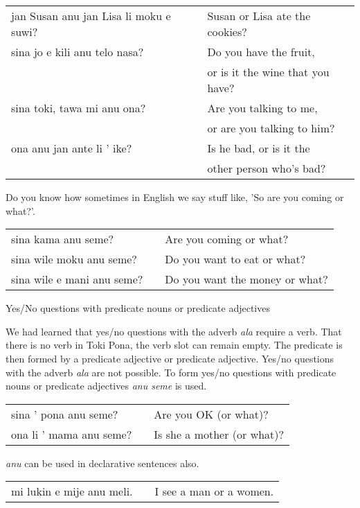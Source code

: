 \begin{supertabular}{p{5,5cm}|ll}
jan Susan anu jan Lisa li moku e suwi?  && Susan or Lisa ate the cookies? \\
sina jo e kili anu telo nasa? && Do you have the fruit, \\ && or is it the wine that you have? \\
sina toki, tawa mi anu ona? && Are you talking to me, \\ && or are you talking to him? \\
ona anu jan ante li ' ike? && Is he bad, or is it the \\ && other person who's bad? \\
\end{supertabular} 

Do you know how sometimes in English we say stuff like, 'So are you coming or what?'. 

\begin{supertabular}{p{5,5cm}|ll}
sina kama anu seme? && Are you coming or what? \\ 
sina wile moku anu seme? && Do you want to eat or what? \\
sina wile e mani anu seme? && Do you want the money or what? \\
\end{supertabular} 

Yes/No questions with predicate nouns or predicate adjectives

We had learned that yes/no questions with the adverb \textit{ala} require a verb. 
That there is no verb in Toki Pona, the verb slot can remain empty. 
The predicate is then formed by a predicate adjective or predicate adjective.
Yes/no questions with the adverb \textit{ala} are not possible. 
To form yes/no questions with predicate nouns or predicate adjectives \textit{anu seme} is used. 

\begin{supertabular}{p{5,5cm}|ll}
sina ' pona anu seme? && Are you OK (or what)? \\
ona li ' mama anu seme? && Is she a mother (or what)? \\
\end{supertabular} 

\textit{anu} can be used in declarative sentences also.

\begin{supertabular}{p{5,5cm}|ll}
mi lukin e mije anu meli. && I see a man or a women. \\ 
\end{supertabular} 
%

